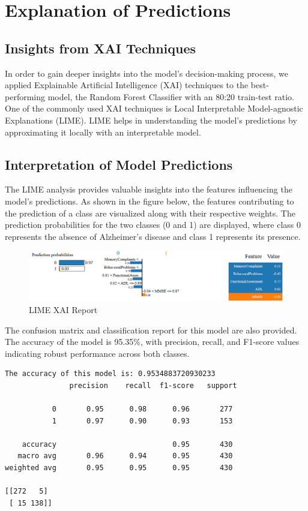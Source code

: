 \documentclass[a4paper,12pt]{report}
\begin{document}
\section{Explanation of Predictions}

\subsection{Insights from XAI Techniques}

In order to gain deeper insights into the model's decision-making process, we applied Explainable Artificial Intelligence (XAI) techniques to the best-performing model, the Random Forest Classifier with an 80:20 train-test ratio. One of the commonly used XAI techniques is Local Interpretable Model-agnostic Explanations (LIME). LIME helps in understanding the model's predictions by approximating it locally with an interpretable model.

\subsection{Interpretation of Model Predictions}

The LIME analysis provides valuable insights into the features influencing the model's predictions. As shown in the figure below, the features contributing to the prediction of a class are visualized along with their respective weights. The prediction probabilities for the two classes (0 and 1) are displayed, where class 0 represents the absence of Alzheimer's disease and class 1 represents its presence.

\begin{figure}[h]
    \centering
    \includegraphics[width=\textwidth]{lime_xai_report.png}
    \caption{LIME XAI Report}
    \label{fig:lime_xai_report}
\end{figure}

The confusion matrix and classification report for this model are also provided. The accuracy of the model is 95.35\%, with precision, recall, and F1-score values indicating robust performance across both classes.

\begin{verbatim}
The accuracy of this model is: 0.9534883720930233
               precision    recall  f1-score   support

           0       0.95      0.98      0.96       277
           1       0.97      0.90      0.93       153

    accuracy                           0.95       430
   macro avg       0.96      0.94      0.95       430
weighted avg       0.95      0.95      0.95       430

[[272   5]
 [ 15 138]]
\end{verbatim}
\end{document}
